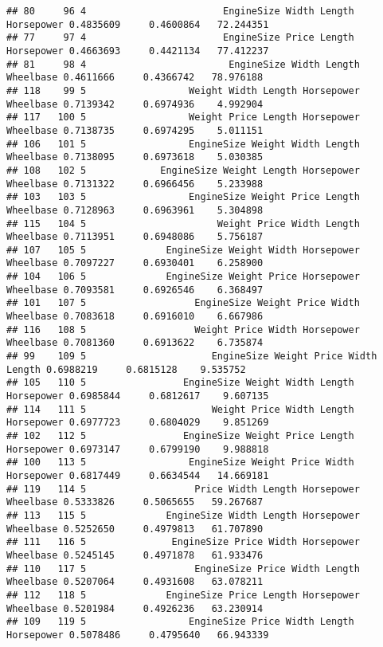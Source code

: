 \documentclass[
]{book}
\begin{document}
\begin{verbatim}
## 80     96 4                        EngineSize Width Length Horsepower 0.4835609     0.4600864   72.244351
## 77     97 4                        EngineSize Price Length Horsepower 0.4663693     0.4421134   77.412237
## 81     98 4                         EngineSize Width Length Wheelbase 0.4611666     0.4366742   78.976188
## 118    99 5                  Weight Width Length Horsepower Wheelbase 0.7139342     0.6974936    4.992904
## 117   100 5                  Weight Price Length Horsepower Wheelbase 0.7138735     0.6974295    5.011151
## 106   101 5                  EngineSize Weight Width Length Wheelbase 0.7138095     0.6973618    5.030385
## 108   102 5             EngineSize Weight Length Horsepower Wheelbase 0.7131322     0.6966456    5.233988
## 103   103 5                  EngineSize Weight Price Length Wheelbase 0.7128963     0.6963961    5.304898
## 115   104 5                       Weight Price Width Length Wheelbase 0.7113951     0.6948086    5.756187
## 107   105 5              EngineSize Weight Width Horsepower Wheelbase 0.7097227     0.6930401    6.258900
## 104   106 5              EngineSize Weight Price Horsepower Wheelbase 0.7093581     0.6926546    6.368497
## 101   107 5                   EngineSize Weight Price Width Wheelbase 0.7083618     0.6916010    6.667986
## 116   108 5                   Weight Price Width Horsepower Wheelbase 0.7081360     0.6913622    6.735874
## 99    109 5                      EngineSize Weight Price Width Length 0.6988219     0.6815128    9.535752
## 105   110 5                 EngineSize Weight Width Length Horsepower 0.6985844     0.6812617    9.607135
## 114   111 5                      Weight Price Width Length Horsepower 0.6977723     0.6804029    9.851269
## 102   112 5                 EngineSize Weight Price Length Horsepower 0.6973147     0.6799190    9.988818
## 100   113 5                  EngineSize Weight Price Width Horsepower 0.6817449     0.6634544   14.669181
## 119   114 5                   Price Width Length Horsepower Wheelbase 0.5333826     0.5065655   59.267687
## 113   115 5              EngineSize Width Length Horsepower Wheelbase 0.5252650     0.4979813   61.707890
## 111   116 5               EngineSize Price Width Horsepower Wheelbase 0.5245145     0.4971878   61.933476
## 110   117 5                   EngineSize Price Width Length Wheelbase 0.5207064     0.4931608   63.078211
## 112   118 5              EngineSize Price Length Horsepower Wheelbase 0.5201984     0.4926236   63.230914
## 109   119 5                  EngineSize Price Width Length Horsepower 0.5078486     0.4795640   66.943339

\end{verbatim}
\end{document}
